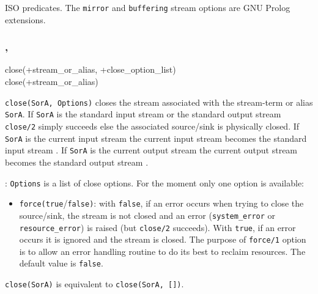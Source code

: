 \Portability

ISO predicates. The \texttt{mirror} and \texttt{buffering} stream options
are GNU Prolog extensions.

\subsubsection{,\label{close/2}
               }


\begin{TemplatesOneCol}
close(+stream\_or\_alias, +close\_option\_list)\\
close(+stream\_or\_alias)

\end{TemplatesOneCol}

\Description

\texttt{close(SorA, Options)} closes the stream associated with the stream-term
or alias \texttt{SorA}. If \texttt{SorA} is the standard input stream or the
standard output stream \texttt{close/2} simply succeeds else the associated
source/sink is physically closed. If \texttt{SorA} is the current input
stream the current input stream becomes the standard input stream
. If \texttt{SorA} is the current output stream the
current output stream becomes the standard output stream
.

: \texttt{Options} is a list of close options. For the
moment only one option is available:

\begin{itemize}

\item {}\texttt{force(true}/\texttt{false)}: with \texttt{false}, if
an error occurs when trying to close the source/sink, the stream is not
closed and an error (\texttt{system\_error} or \texttt{resource\_error}) is
raised (but \texttt{close/2} succeeds). With \texttt{true}, if an error
occurs it is ignored and the stream is closed. The purpose of
\texttt{force/1} option is to allow an error handling routine to do its best
to reclaim resources. The default value is \texttt{false}.

\end{itemize}

\texttt{close(SorA)} is equivalent to \texttt{close(SorA, [])}.

